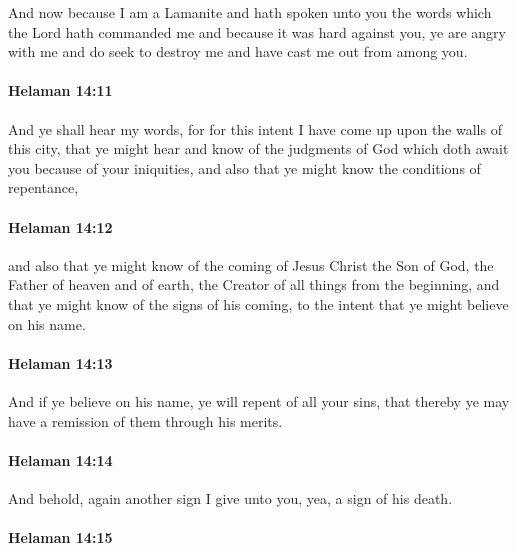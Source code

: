 			And now because I am a Lamanite
			and hath spoken unto you the words which the Lord hath commanded me
			and because it was hard against you,
			ye are angry with me and do seek to destroy me
			and have cast me out from among you.

		\paragraph{Helaman 14:11} %
			\label{HELAMAN-14-11}

			And ye shall hear my words,
			for for this intent I have come up upon the walls of this city,
			that ye might hear and know of the judgments of God
			which doth await you because of your iniquities,
			and also that ye might know the conditions of repentance,

		\paragraph{Helaman 14:12} %
			\label{HELAMAN-14-12}

			and also that ye might know of the coming of Jesus Christ the Son of God,
			the Father of heaven and of earth,
			the Creator of all things from the beginning,
			and that ye might know of the signs of his coming,
			to the intent that ye might believe on his name.

		\paragraph{Helaman 14:13} %
			\label{HELAMAN-14-13}

			And if ye believe on his name,
			ye will repent of all your sins,
			that thereby ye may have a remission of them through his merits.

		\paragraph{Helaman 14:14} %
			\label{HELAMAN-14-14}

			And behold, again another sign I give unto you, yea, a sign of his death.

		\paragraph{Helaman 14:15} %
			\label{HELAMAN-14-15}

